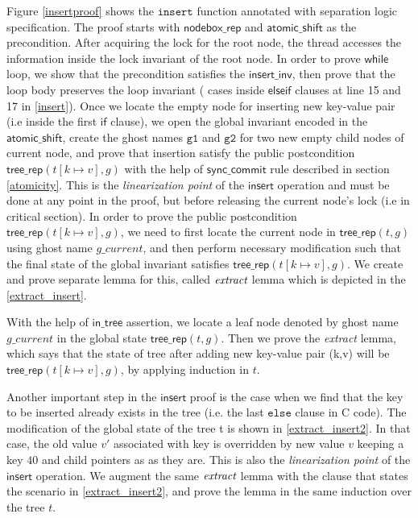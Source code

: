 \documentclass[acmsmall,screen]{acmart}\settopmatter{printfolios=true}
\begin{document}
Figure \ref{insertproof} shows the $\texttt{insert}$ function annotated with separation logic specification. The proof starts with $\mathsf{nodebox\_rep}$ and $\mathsf{atomic\_shift}$ as the precondition. After acquiring the lock for the root node, the thread accesses the information inside the lock invariant of the root node. In order to prove $\mathsf{while}$ loop, we show that the precondition satisfies the $\mathsf{insert\_inv}$, then prove that the loop body preserves the loop invariant ( cases inside $\mathsf{else if}$ clauses at line 15 and 17 in \ref{insert}).   Once we locate the empty node for inserting new key-value pair (i.e inside the first $\mathsf{if}$ clause), we open the global invariant encoded in the $\mathsf{atomic\_shift}$, create the ghost names $\texttt{g1}$ and $\texttt{g2}$ for two new empty child nodes of current node, and prove that insertion satisfy the public postcondition $\mathsf{tree\_rep}(t[k\mapsto v],g)$ with the help of $\mathsf{sync\_commit}$ rule described in section \ref{atomicity}. This is the \emph{linearization point} of the $\mathsf{insert}$ operation and must be done at any point in the proof, but before releasing the current node's lock (i.e in critical section). In order to prove the public postcondition $\mathsf{tree\_rep}(t[k\mapsto v],g)$, we need to first locate the current node in $\mathsf{tree\_rep}(t,g)$ using ghost name $g\_current$, and then perform necessary modification such that the final state of the global invariant satisfies $\mathsf{tree\_rep}(t[k\mapsto v],g)$. We create and prove separate lemma for this, called $\emph{extract}$ lemma which is depicted in the \ref{extract_insert}.  

With the help of $\mathsf{in\_tree}$ assertion, we locate a leaf node denoted by ghost name $g\_current$ in the global state $\mathsf{tree\_rep}(t,g)$. Then we prove the \emph{extract} lemma, which says that the state of tree after adding new key-value pair (k,v) will be $\mathsf{tree\_rep}(t[k\mapsto v],g)$, by applying induction in $t$. 

Another important step in the $\mathsf{insert}$ proof is the case when we find that the key to be inserted already exists in the tree (i.e. the last $\texttt{else}$ clause in C code). The modification of the global state of the tree t is shown in \ref{extract_insert2}. In that case, the old value $v'$ associated with key is overridden by new value $v$ keeping a key $40$ and child pointers as as they are. This is also the \emph{linearization point} of the $\mathsf{insert}$ operation. We augment the same $\emph{extract}$ lemma with the clause that states the scenario in \ref{extract_insert2}, and prove the lemma in the same induction over the tree $t$.
\end{document}
